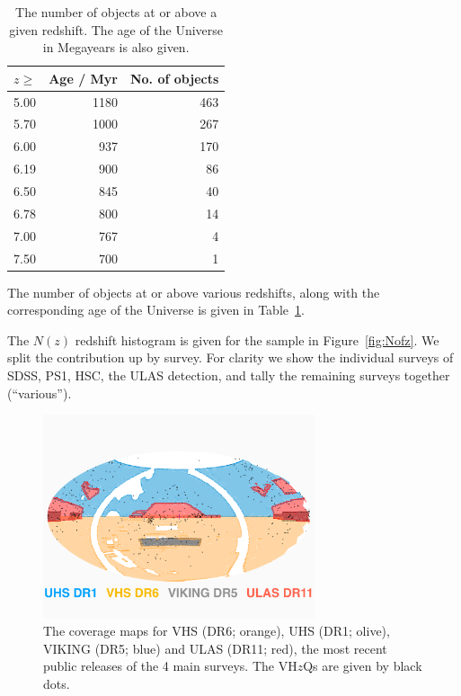 \documentclass[usenatbib]{mnras}
\begin{document}
\begin{table}
\centering
\begin{tabular}{l r  r}
\hline \hline
$z \geq$  & Age / Myr & No. of objects \\
\hline 
5.00         & 1180          &  463   \\
5.70         & 1000          &  267   \\
6.00         &   937          &  170   \\
6.19         &   900          &  86   \\
6.50         &    845         &  40   \\
6.78         &    800         &  14   \\
7.00         &    767         &   4   \\
7.50         &    700         &   1   \\
\hline \hline
\end{tabular}
\caption{The number of objects at or above a given redshift. 
The age of the Universe in Megayears is also given. }
      \label{tab:ages}
\end{table}

The number of objects at or above various redshifts, along with the 
corresponding age of the Universe is given in Table~\ref{tab:ages}. 

The $N(z)$ redshift histogram is given for the sample in Figure~\ref{fig:Nofz}. 
We split the contribution up by survey. For clarity we show the individual 
surveys of SDSS, PS1, HSC, the ULAS detection, and tally the remaining 
surveys together (``various''). 


\begin{figure}
  \includegraphics[width=8.0cm, clip, trim=0mm 25mm 0mm 40mm]
  {../data/WSA_VSA/CoverageMaps_VHzQ_forpaper.pdf}
  \centering
  \caption[]
  {The coverage maps for VHS (DR6; orange), UHS (DR1; olive), VIKING (DR5; blue) and ULAS (DR11; red), the most recent public releases of the 4 main surveys. The VH$z$Qs are given by black dots.}
  \label{fig:coverage}
\end{figure}
\end{document}
